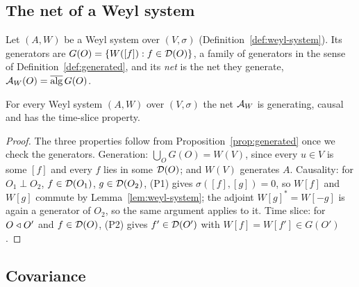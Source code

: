 \subsection{The net of a Weyl system}

\noindent{}

\begin{definition}\label{def:weyl-net}
Let $(A,W)$ be a Weyl system over $(V,\sigma)$ (Definition~\ref{def:weyl-system}). Its generators
are $G(O)=\{W([f]):f\in\mathcal D(O)\}$, a family of generators in the sense of
Definition~\ref{def:generated}, and its \emph{net} is the net they generate,
$\mathcal A_W(O)=\overline{\operatorname{alg}}\,G(O)$.
\end{definition}

\begin{theorem}\label{thm:weyl-net}
For  every Weyl system $(A,W)$
over $(V,\sigma)$\revk{,} the net $\mathcal A_W$ is generating, causal and has the time-slice property.
\end{theorem}
\begin{proof}
The three properties follow from Proposition~\ref{prop:generated} once we check the
generators. Generation: $\bigcup_OG(O)=W(V)$, since every $u\in V$ is some $[f]$ and every $f$ lies
in some $\mathcal D(O)$; and $W(V)$ generates $A$. Causality: for $O_1\perp O_2$, $f\in\mathcal D(O_1)$,
$g\in\mathcal D(O_2)$, (P1) gives $\sigma([f],[g])=0$, so $W[f]$ and $W[g]$ commute by
Lemma~\ref{lem:weyl-system}; the adjoint $W[g]^*=W[-g]$ is again a generator of $O_2$, so the
same argument applies to it. Time slice: for $O\mathrel{\triangleleft} O'$ and $f\in\mathcal D(O)$, (P2) gives
$f'\in\mathcal D(O')$ with $W[f]=W[f']\in G(O')$.
\end{proof}

\begin{extra}
\noindent{}
\end{extra}

\subsection{Covariance}

